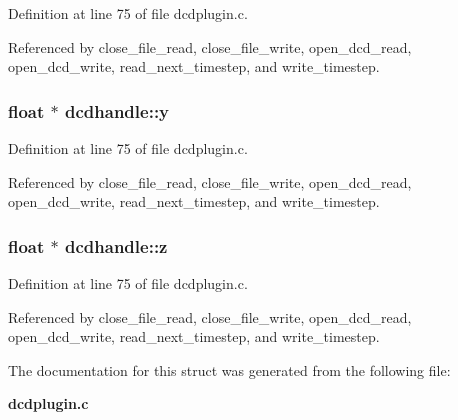Definition at line 75 of file dcdplugin.c.

Referenced by close\_\-file\_\-read, close\_\-file\_\-write, open\_\-dcd\_\-read, open\_\-dcd\_\-write, read\_\-next\_\-timestep, and write\_\-timestep.
\subsubsection{\setlength{\rightskip}{0pt plus 5cm}float $\ast$ dcdhandle::y}\label{structdcdhandle_m9}




Definition at line 75 of file dcdplugin.c.

Referenced by close\_\-file\_\-read, close\_\-file\_\-write, open\_\-dcd\_\-read, open\_\-dcd\_\-write, read\_\-next\_\-timestep, and write\_\-timestep.
\subsubsection{\setlength{\rightskip}{0pt plus 5cm}float $\ast$ dcdhandle::z}\label{structdcdhandle_m10}




Definition at line 75 of file dcdplugin.c.

Referenced by close\_\-file\_\-read, close\_\-file\_\-write, open\_\-dcd\_\-read, open\_\-dcd\_\-write, read\_\-next\_\-timestep, and write\_\-timestep.

The documentation for this struct was generated from the following file:\begin{CompactItemize}
\item 
{\bf dcdplugin.c}\end{CompactItemize}
